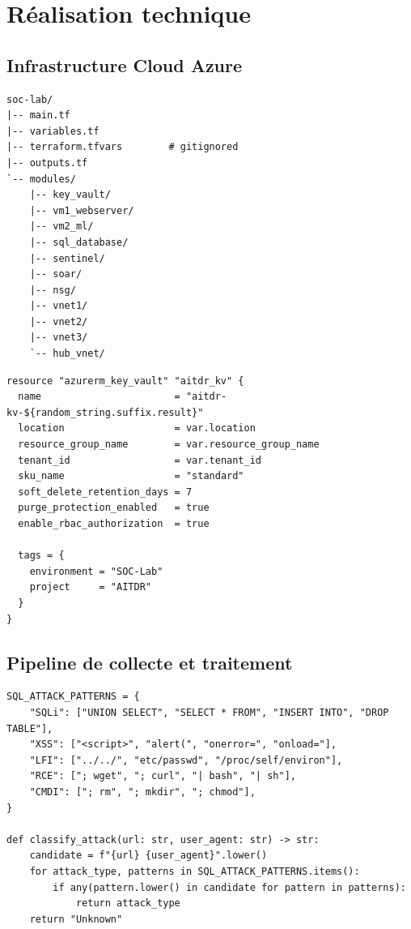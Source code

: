 \documentclass[11pt,a4paper]{report}
\begin{document}
\chapter{Réalisation technique}

\section{Infrastructure Cloud Azure}

\begin{lstlisting}[style=bashstyle, caption={Arborescence des modules Terraform AITDR}]
soc-lab/
|-- main.tf
|-- variables.tf
|-- terraform.tfvars        # gitignored
|-- outputs.tf
`-- modules/
    |-- key_vault/
    |-- vm1_webserver/
    |-- vm2_ml/
    |-- sql_database/
    |-- sentinel/
    |-- soar/
    |-- nsg/
    |-- vnet1/
    |-- vnet2/
    |-- vnet3/
    `-- hub_vnet/
\end{lstlisting}

\begin{lstlisting}[style=hclstyle, caption={Module Key Vault corrigé}]
resource "azurerm_key_vault" "aitdr_kv" {
  name                       = "aitdr-kv-${random_string.suffix.result}"
  location                   = var.location
  resource_group_name        = var.resource_group_name
  tenant_id                  = var.tenant_id
  sku_name                   = "standard"
  soft_delete_retention_days = 7
  purge_protection_enabled   = true
  enable_rbac_authorization  = true

  tags = {
    environment = "SOC-Lab"
    project     = "AITDR"
  }
}
\end{lstlisting}

\section{Pipeline de collecte et traitement}

\begin{lstlisting}[style=pythonstyle, caption={Classification des attaques web}]
SQL_ATTACK_PATTERNS = {
    "SQLi": ["UNION SELECT", "SELECT * FROM", "INSERT INTO", "DROP TABLE"],
    "XSS": ["<script>", "alert(", "onerror=", "onload="],
    "LFI": ["../../", "etc/passwd", "/proc/self/environ"],
    "RCE": ["; wget", "; curl", "| bash", "| sh"],
    "CMDI": ["; rm", "; mkdir", "; chmod"],
}

def classify_attack(url: str, user_agent: str) -> str:
    candidate = f"{url} {user_agent}".lower()
    for attack_type, patterns in SQL_ATTACK_PATTERNS.items():
        if any(pattern.lower() in candidate for pattern in patterns):
            return attack_type
    return "Unknown"
\end{lstlisting}
\end{document}
